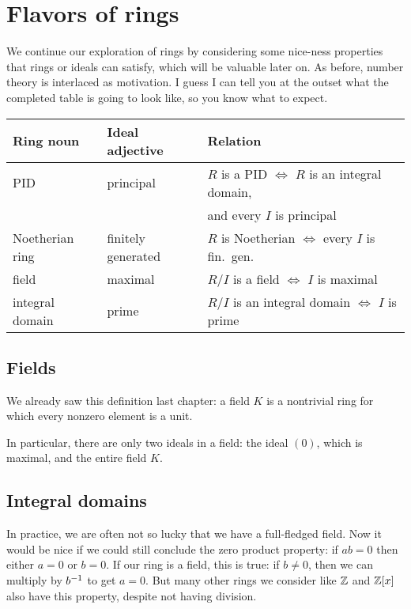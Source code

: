 \chapter{Flavors of rings}
We continue our exploration of rings by considering
some nice-ness properties that rings or ideals can satisfy,
which will be valuable later on.
As before, number theory is interlaced as motivation.
I guess I can tell you at the outset what the completed table
is going to look like, so you know what to expect.

\begin{center}
	\begin{tabular}[h]{lll}
		Ring noun & Ideal adjective & Relation \\ \hline
		PID & principal &
			$R$ is a PID $\iff$ $R$ is an integral domain, \\
			&& \qquad and every $I$ is principal \\
		Noetherian ring & finitely generated &
			$R$ is Noetherian $\iff$ every $I$ is fin.\ gen. \\
		field & maximal & $R/I$ is a field $\iff$ $I$ is maximal \\
		integral domain & prime & $R/I$ is an integral domain
			$\iff$ $I$ is prime \\
	\end{tabular}
\end{center}

\section{Fields}

We already saw this definition last chapter:
a field $K$ is a nontrivial ring for which every nonzero element is a unit.

In particular, there are only two ideals in a field:
the ideal $(0)$, which is maximal, and the entire field $K$.

\section{Integral domains}

In practice, we are often not so lucky that we have a full-fledged field.
Now it would be nice if we could still conclude the zero product property:
if $ab = 0$ then either $a = 0$ or $b = 0$.
If our ring is a field, this is true: if $b \neq 0$,
then we can multiply by $b^{-1}$ to get $a = 0$.
But many other rings we consider like $\mathbb Z$ and $\mathbb Z[x]$ also have this property,
despite not having division.

